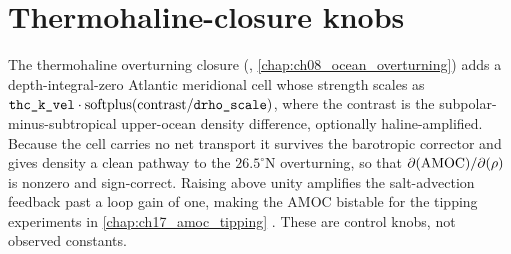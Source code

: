 
\section{Thermohaline-closure knobs}

The thermohaline overturning closure
(, \ref{chap:ch08_ocean_overturning}) adds a
depth-integral-zero Atlantic meridional cell whose strength scales as
$\texttt{thc\_k\_vel}\cdot\operatorname{softplus}(\text{contrast}/\texttt{drho\_scale})$, where the
contrast is the subpolar-minus-subtropical upper-ocean density difference,
optionally haline-amplified. Because the cell carries no net transport it
survives the barotropic corrector and gives density a clean pathway to the
$26.5^\circ$N overturning, so that $\partial(\mathrm{AMOC})/\partial(\rho)$ is
nonzero and sign-correct. Raising  above unity amplifies
the salt-advection feedback past a loop gain of one, making the AMOC bistable for
the tipping experiments in \ref{chap:ch17_amoc_tipping}
\citep{stommel1961, rahmstorf2005, marotzke1991}. These are control knobs, not
observed constants.

